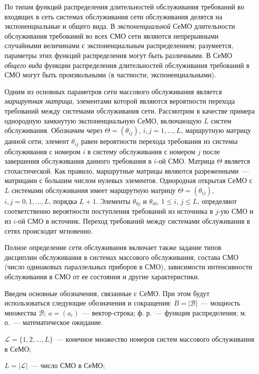 По типам функций распределения длительностей обслуживания требований во входящих в сеть системах обслуживания сети обслуживания делятся на экспоненциальные и общего вида. В \textit{экспоненциальной} СеМО длительности обслуживания требований во всех СМО сети являются непрерывными случайными величинами с экспоненциальным распределением; разумеется, параметры этих функций распределения могут быть различными. В СеМО \textit{общего вида} функции распределения длительностей обслуживания требований в СМО могут быть произвольными (в частности, экспоненциальными).

Одним из основных параметров сети массового обслуживания является \textit{маршрутная матрица}, элементами которой являются вероятности перехода требований между системами обслуживания сети. Рассмотрим в качестве примера однородную замкнутую экспоненциальную СеМО, включающую $L$ систем обслуживания. Обозначим через $\Theta=\left(\theta_{ij}\right)$, $i,j=1,...,L$, маршрутную матрицу данной сети; элемент $\theta_{ij}$ равен вероятности перехода требования из системы обслуживания с номером $i$ в систему обслуживания с номером $j$ после завершения обслуживания данного требования в $i$-ой СМО. Матрица $\Theta$ является стохастической. Как правило, маршрутные матрицы являются разреженными~--- матрицами с большим числом нулевых элементов. Однородная открытая СеМО с $L$ системами обслуживания имеет маршрутную матрицу  $\Theta=\left(\theta_{ij}\right)$, $i,j=0,1,...,L$, порядка $L+1$. Элементы $\theta_{0j}$ и $\theta_{i0}$, $1 \le i$, $j \le L$, определяют соответственно вероятности поступления требований из источника в $j$-ую СМО и из $i$-ой СМО в источник. Переход требований между системами обслуживания в сетях происходит мгновенно.

Полное определение сети обслуживания включает также задание типов дисциплин обслуживания в системах массового обслуживания, состава СМО (число одинаковых параллельных приборов в СМО), зависимости интенсивности обслуживания в СМО от ее состояния и другие характеристики.

Введем основные обозначения, связанные с СеМО. При этом будут использоваться следующие обозначения и сокращения: $B=\left| \mathscr{B} \right|$~--- мощность множества $\mathscr{B}$; $a=(a_i)$~---  вектор-строка; ф. р.~--- функция распределения; м. о.~--- математическое ожидание.

$\mathscr{L}=\{1,2,...,L\}$~--- конечное множество номеров систем массового обслуживания в СеМО;

$L=\left| \mathscr{L} \right|$~--- число СМО в СеМО;


